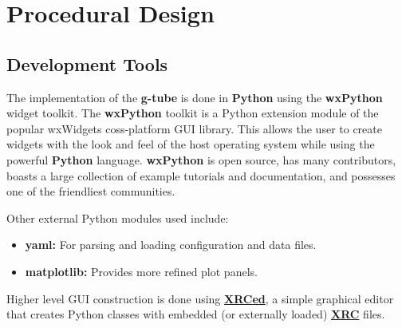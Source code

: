 \documentclass[12pt]{article}
\begin{document}
\section*{Procedural Design}

\subsection*{Development Tools}

	The implementation of the {\bf g-tube} is done in {\bf Python} using the {\bf wxPython} widget toolkit. The {\bf wxPython} toolkit is a Python extension module of the popular {wxWidgets} coss-platform GUI library. This allows the user to create widgets with the look and feel of the host operating system while using the powerful {\bf Python} language. {\bf wxPython} is open source, has many contributors, boasts a large collection of example tutorials and documentation, and possesses one of the friendliest communities.
	
Other external Python modules used include:

\begin{itemize}	
\item[] {\bf yaml:} For parsing and loading configuration and data files.
\item[] {\bf matplotlib:} Provides more refined plot panels.
\end{itemize}

Higher level GUI construction is done using \href{http://xrced.sourceforge.net/}{\bf XRCed}, a simple graphical editor that creates Python classes with embedded (or externally loaded) \href{http://wiki.wxpython.org/XRCTutorial}{\bf XRC} files. 
\end{document}
